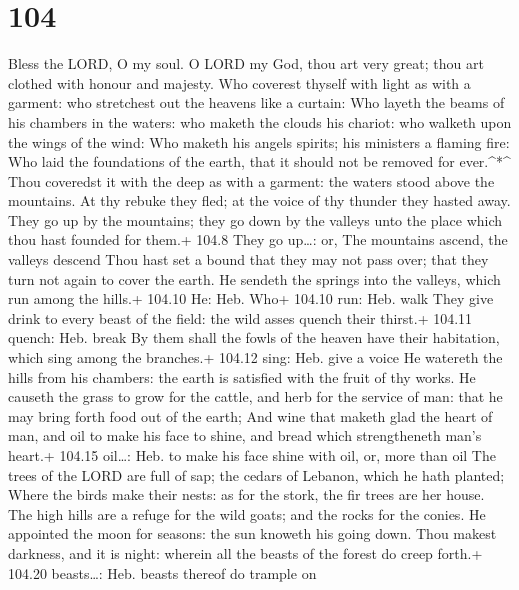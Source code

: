 \hypertarget{section-103}{%
\section{104}\label{section-103}}

 Bless the LORD, O my soul. O LORD my God, thou art very
great; thou art clothed with honour and majesty.  Who
coverest thyself with light as with a garment: who stretchest out the
heavens like a curtain:  Who layeth the beams of his
chambers in the waters: who maketh the clouds his chariot: who walketh
upon the wings of the wind:  Who maketh his angels spirits;
his ministers a flaming fire:  Who laid the foundations of
the earth, that it should not be removed for ever.\^{}*\^{} 
Thou coveredst it with the deep as with a garment: the waters stood
above the mountains.  At thy rebuke they fled; at the voice
of thy thunder they hasted away.  They go up by the
mountains; they go down by the valleys unto the place which thou hast
founded for them.+ 104.8 They go up\ldots: or, The mountains ascend, the
valleys descend  Thou hast set a bound that they may not
pass over; that they turn not again to cover the earth.  He
sendeth the springs into the valleys, which run among the hills.+ 104.10
He: Heb. Who+ 104.10 run: Heb. walk  They give drink to
every beast of the field: the wild asses quench their thirst.+ 104.11
quench: Heb. break  By them shall the fowls of the heaven
have their habitation, which sing among the branches.+ 104.12 sing: Heb.
give a voice  He watereth the hills from his chambers: the
earth is satisfied with the fruit of thy works.  He causeth
the grass to grow for the cattle, and herb for the service of man: that
he may bring forth food out of the earth;  And wine that
maketh glad the heart of man, and oil to make his face to shine, and
bread which strengtheneth man's heart.+ 104.15 oil\ldots: Heb. to make
his face shine with oil, or, more than oil  The trees of
the LORD are full of sap; the cedars of Lebanon, which he hath planted;
 Where the birds make their nests: as for the stork, the
fir trees are her house.  The high hills are a refuge for
the wild goats; and the rocks for the conies.  He appointed
the moon for seasons: the sun knoweth his going down.  Thou
makest darkness, and it is night: wherein all the beasts of the forest
do creep forth.+ 104.20 beasts\ldots: Heb. beasts thereof do trample on
